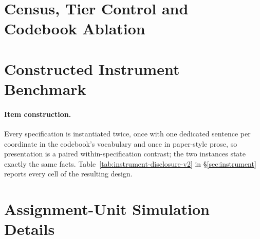 \documentclass[11pt]{article}
\begin{document}
\FloatBarrier
\section{Census, Tier Control and Codebook Ablation}
\label{sec:appendix-census}











\FloatBarrier
\section{Constructed Instrument Benchmark}
\label{sec:appendix-instrument}





\paragraph{Item construction.}
Every specification is instantiated twice, once with one dedicated sentence per
coordinate in the codebook's vocabulary and once in paper-style prose, so
presentation is a paired within-specification contrast; the two instances state
exactly the same facts. Table~\ref{tab:instrument-disclosure-v2} in
\S\ref{sec:instrument} reports every cell of the resulting design.

\FloatBarrier


\FloatBarrier
\section{Assignment-Unit Simulation Details}
\label{sec:appendix-sim}
\end{document}
